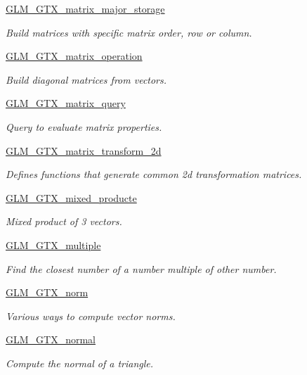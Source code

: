 \begin{DoxyCompactItemize}
\hyperlink{group__gtx__matrix__major__storage}{G\+L\+M\+\_\+\+G\+T\+X\+\_\+matrix\+\_\+major\+\_\+storage}
\begin{DoxyCompactList}\small\item\em Build matrices with specific matrix order, row or column. \end{DoxyCompactList}\item 
\hyperlink{group__gtx__matrix__operation}{G\+L\+M\+\_\+\+G\+T\+X\+\_\+matrix\+\_\+operation}
\begin{DoxyCompactList}\small\item\em Build diagonal matrices from vectors. \end{DoxyCompactList}\item 
\hyperlink{group__gtx__matrix__query}{G\+L\+M\+\_\+\+G\+T\+X\+\_\+matrix\+\_\+query}
\begin{DoxyCompactList}\small\item\em Query to evaluate matrix properties. \end{DoxyCompactList}\item 
\hyperlink{group__gtx__matrix__transform__2d}{G\+L\+M\+\_\+\+G\+T\+X\+\_\+matrix\+\_\+transform\+\_\+2d}
\begin{DoxyCompactList}\small\item\em Defines functions that generate common 2d transformation matrices. \end{DoxyCompactList}\item 
\hyperlink{group__gtx__mixed__product}{G\+L\+M\+\_\+\+G\+T\+X\+\_\+mixed\+\_\+producte}
\begin{DoxyCompactList}\small\item\em Mixed product of 3 vectors. \end{DoxyCompactList}\item 
\hyperlink{group__gtx__multiple}{G\+L\+M\+\_\+\+G\+T\+X\+\_\+multiple}
\begin{DoxyCompactList}\small\item\em Find the closest number of a number multiple of other number. \end{DoxyCompactList}\item 
\hyperlink{group__gtx__norm}{G\+L\+M\+\_\+\+G\+T\+X\+\_\+norm}
\begin{DoxyCompactList}\small\item\em Various ways to compute vector norms. \end{DoxyCompactList}\item 
\hyperlink{group__gtx__normal}{G\+L\+M\+\_\+\+G\+T\+X\+\_\+normal}
\begin{DoxyCompactList}\small\item\em Compute the normal of a triangle. \end{DoxyCompactList}\item 

\end{DoxyCompactItemize}
